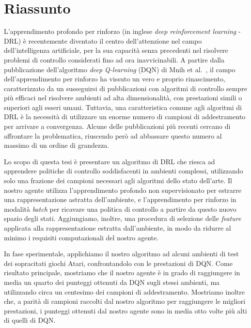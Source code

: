 \newpage
\chapter*{Riassunto}


L'apprendimento profondo per rinforzo (in inglese \textit{deep reinforcement 
learning} - DRL) \`e recentemente diventato il centro dell'attenzione nel campo 
dell'intelligenza artificiale, per la sua capacit\`a senza precedenti nel 
risolvere problemi di controllo considerati fino ad ora inavvicinabili.
A partire dalla pubblicazione dell'algoritmo \textit{deep Q-learning} (DQN) di 
Mnih et al.\ \cite{mnih2015human}, il campo dell'apprendimento per rinforzo ha 
vissuto un vero e proprio rinascimento, caratterizzato da un susseguirsi di 
pubblicazioni con algoritmi di controllo sempre pi\`u efficaci nel risolvere 
ambienti ad alta dimensionalit\`a, con prestazioni simili o superiori agli esseri 
umani. 
Tuttavia, una caratteristica comune agli algoritmi di DRL \`e la 
necessit\`a di utilizzare un enorme numero di campioni di addestramento per
arrivare a convergenza. Alcune delle pubblicazioni pi\`u recenti cercano di 
affrontare la problematica, riuscendo per\`o ad abbassare questo numero al 
massimo di un ordine di grandezza.

Lo scopo di questa tesi \`e presentare un algoritmo di DRL che riesca ad 
apprendere politiche di controllo soddisfacenti in ambienti complessi, 
utilizzando solo una frazione dei campioni necessari agli algoritmi dello stato 
dell'arte. 
Il nostro agente utilizza l'apprendimento profondo non supervisionato per 
estrarre una rappresentazione astratta dell'ambiente, e l'apprendimento per 
rinforzo in modalit\`a \textit{batch} per ricavare una politica di controllo 
a partire da questo nuovo spazio degli stati. 
Aggiungiamo, inoltre, una procedura di selezione delle \textit{feature} 
applicata alla rappresentazione estratta dall'ambiente, in modo da ridurre al 
minimo i requisiti computazionali del nostro agente. 

In fase sperimentale, applichiamo il nostro algoritmo ad alcuni ambienti di test 
dei sopracitati giochi Atari, confrontandolo con le prestazioni di DQN. 
Come risultato principale, mostriamo che il nostro agente \`e in grado di 
raggiungere in media un quarto dei punteggi ottenuti da DQN sugli stessi 
ambienti, ma utilizzando circa un centesimo dei campioni di addestramento.
Mostriamo inoltre che, a parit\`a di campioni raccolti dal nostro algoritmo per
raggiungere le migliori prestazioni, i punteggi ottenuti dal nostro agente sono 
in media otto volte pi\`u alti di quelli di DQN. 

